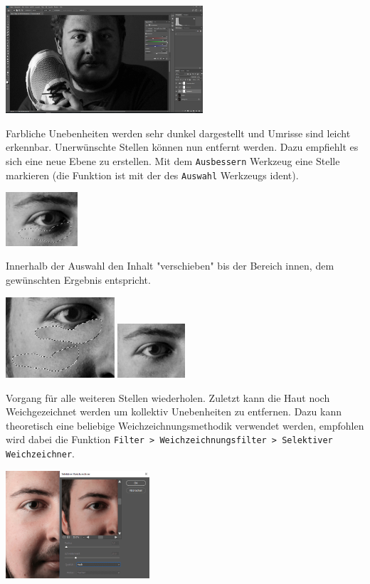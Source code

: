 \documentclass{school}
\begin{document}
\begin{outline}[enumerate]
\includegraphics[height=4cm]{retusche-04-kanalmixer.png}

		\3 Farbliche Unebenheiten werden sehr dunkel dargestellt und Umrisse sind leicht erkennbar.
	\2 Unerwünschte Stellen können nun entfernt werden. Dazu empfiehlt es sich eine neue Ebene zu erstellen.
		\3 Mit dem \texttt{Ausbessern} Werkzeug eine Stelle markieren (die Funktion ist mit der des \texttt{Auswahl} Werkzeugs ident).

\includegraphics[height=2cm]{retusche-05-auswahl.png}

		\3 Innerhalb der Auswahl den Inhalt "verschieben" bis der Bereich innen, dem gewünschten Ergebnis entspricht.

\includegraphics[height=3cm]{retusche-06-verbesserung.png}
\includegraphics[height=2cm]{retusche-07-verbessert.png}

		\3 Vorgang für alle weiteren Stellen wiederholen.
	\2 Zuletzt kann die Haut noch Weichgezeichnet werden um kollektiv Unebenheiten zu entfernen. Dazu kann theoretisch eine beliebige Weichzeichnungsmethodik verwendet werden, empfohlen wird dabei die Funktion \texttt{Filter > Weichzeichnungsfilter > Selektiver Weichzeichner}.

\includegraphics[height=4cm]{retusche-08-weich.png}


\end{outline}
\end{document}
